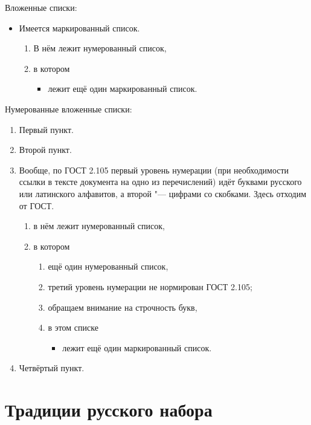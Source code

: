 \noindent Вложенные списки:
\begin{itemize}
  \item Имеется маркированный список.
  \begin{enumerate}
    \item В нём лежит нумерованный список,
    \item в котором
    \begin{itemize}
      \item лежит ещё один маркированный список.
    \end{itemize}    
  \end{enumerate}
\end{itemize}

\noindent Нумерованные вложенные списки:
\begin{enumerate}
  \item Первый пункт.
  \item Второй пункт.
  \item Вообще, по ГОСТ 2.105 первый уровень нумерации
  (при необходимости ссылки в тексте документа на одно из перечислений)
  идёт буквами русского или латинского алфавитов,
  а второй "--- цифрами со скобками.
  Здесь отходим от ГОСТ.
    \begin{enumerate}
      \item в нём лежит нумерованный список,
      \item в котором
        \begin{enumerate}
          \item ещё один нумерованный список,
          \item третий уровень нумерации не нормирован ГОСТ 2.105;
          \item обращаем внимание на строчность букв,
          \item в этом списке
          \begin{itemize}
            \item лежит ещё один маркированный список.
          \end{itemize}    
        \end{enumerate}

    \end{enumerate}

  \item Четвёртый пункт.
\end{enumerate}

\section{Традиции русского набора}

